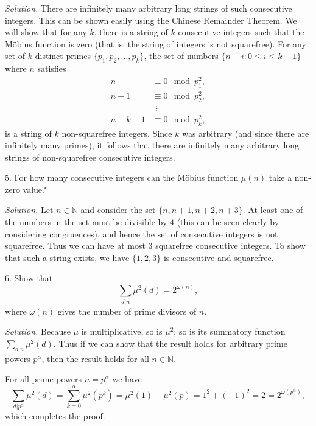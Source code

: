 \documentclass{article}
\newcommand{\N}{\mathbb{N}}
\begin{document}
\textit{Solution.}
There are infinitely many arbitrary long strings of such consecutive integers.
This can be shown easily using the Chinese Remainder Theorem. We will
show that for any $k$, there is a string of $k$ consecutive integers
such that the Möbius function is zero (that is, the string of integers
is not squarefree). For any set of $k$ distinct primes
$\{p_1, p_2, \ldots, p_k\}$, the set
of numbers $\{n + i: 0 \leq i \leq k - 1\}$ where $n$ satisfies
%
\begin{align*}
    n &\equiv 0 \mod p_1^2, \\
    n + 1 &\equiv 0 \mod p_2^2, \\
    &\ \ \vdots \\
    n + k - 1 &\equiv 0 \mod p_k^2
    ,
\end{align*}
%
is a string of $k$ non-squarefree integers. Since $k$ was arbitrary
(and since there are infinitely many primes), it follows that there are
infinitely many arbitrary long strings of non-squarefree consecutive integers.

\newpage

5. For how many consecutive integers can the Möbius function $\mu(n)$
take a non-zero value?

\textit{Solution.}
Let $n \in \N$ and consider the set $\{n, n + 1, n + 2, n + 3\}$.
At least one of the numbers in the set must be divisible by $4$ (this
can be seen clearly by considering congruences),
and hence the set of consecutive integers is not squarefree.
Thus we can have at most $3$ squarefree consecutive integers.
To show that such a string exists, we have $\{1, 2, 3\}$ is consecutive
and squarefree.

\newpage

6. Show that
%
\begin{equation*}
    \sum_{d|n} \mu^2(d) = 2^{\omega(n)}
    ,
\end{equation*}
%
where $\omega(n)$ gives the number of prime divisors of $n$.

\textit{Solution.}
Because $\mu$ is multiplicative, so is $\mu^2$; so is its
summatory function $\sum_{d|n} \mu^2(d)$. Thus if we can show that the
result holds for arbitrary prime powers $p^\alpha$, then the result
holds for all $n \in \N$.

For all prime powers $n = p^\alpha$ we have
%
\begin{equation*}
    \sum_{d|p^\alpha} \mu^2(d)
        = \sum_{k = 0}^\alpha \mu^2(p^k)
        = \mu^2(1) - \mu^2(p)
        = 1^2 + (-1)^2
        = 2
        = 2^{\omega(p^\alpha)}
    ,
\end{equation*}
%
which completes the proof.
\end{document}
